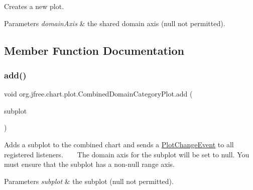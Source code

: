 Creates a new plot.


\begin{DoxyParams}{Parameters}
{\em domain\+Axis} & the shared domain axis ({\ttfamily null} not permitted). \\
\hline
\end{DoxyParams}


\subsection{Member Function Documentation}
\mbox{\label{classorg_1_1jfree_1_1chart_1_1plot_1_1_combined_domain_category_plot_a42e1a292a2f83acd218a2719edfbb30f}} 
\subsubsection{\texorpdfstring{add()}{add()}\hspace{0.1cm}{\footnotesize\ttfamily [1/2]}}
{\footnotesize\ttfamily void org.\+jfree.\+chart.\+plot.\+Combined\+Domain\+Category\+Plot.\+add (\begin{DoxyParamCaption}\item[{\mbox{\hyperlink{classorg_1_1jfree_1_1chart_1_1plot_1_1_category_plot}{Category\+Plot}}}]{subplot }\end{DoxyParamCaption})}

Adds a subplot to the combined chart and sends a \mbox{\hyperlink{}{Plot\+Change\+Event}} to all registered listeners. ~\newline
~\newline
 The domain axis for the subplot will be set to {\ttfamily null}. You must ensure that the subplot has a non-\/null range axis.


\begin{DoxyParams}{Parameters}
{\em subplot} & the subplot ({\ttfamily null} not permitted). \\
\hline
\end{DoxyParams}
\mbox{\label{classorg_1_1jfree_1_1chart_1_1plot_1_1_combined_domain_category_plot_afb7d4a9618b1a645786e8874fbdc4c54}} 
